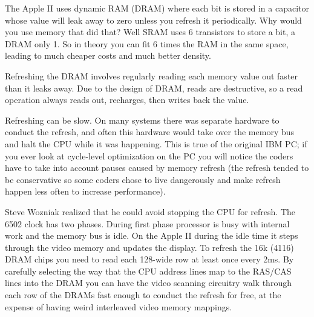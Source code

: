 \documentclass{article}
\begin{document}
The Apple II uses dynamic RAM (DRAM) where each bit is stored in a capacitor
whose value will leak away to zero unless you refresh it periodically.
Why would you use memory that did that?
Well SRAM uses 6 transistors to store a bit, a DRAM only 1.
So in theory you can fit 6 times the RAM in the same space, leading
to much cheaper costs and much better density.

Refreshing the DRAM involves regularly reading each memory value out faster
than it leaks away.
Due to the design of DRAM, reads are destructive,
so a read operation always reads out, recharges, then writes back
the value.

Refreshing can be slow.
On many systems there was separate hardware to conduct the refresh, and
often this hardware would take over the memory bus and halt the CPU
while it was happening.
This is true of the original IBM PC;
if you ever look at cycle-level optimization on the PC
you will notice the coders have to take into account pauses caused by
memory refresh (the refresh tended to be conservative so some coders
chose to live dangerously and make refresh happen less often to increase
performance).


Steve Wozniak realized that he could avoid stopping the CPU for refresh.
The 6502 clock has two phases.
During first phase processor is busy
with internal work and the memory bus is idle.  
On the Apple II during the idle time it steps through the video memory
and updates the display.
To refresh the 16k (4116) DRAM chips you need to read each 128-wide
row at least once every 2ms.
By carefully selecting the way that the CPU address lines map to
the RAS/CAS lines into the DRAM you can have the video scanning
circuitry walk through each row of the DRAMs fast enough to
conduct the refresh for free, at the expense of having weird
interleaved video memory mappings.
\end{document}
